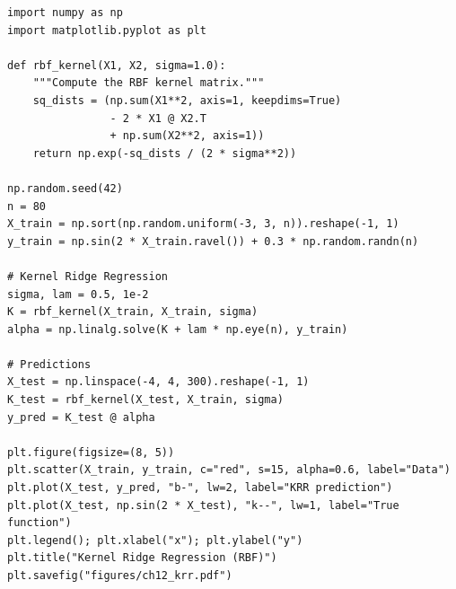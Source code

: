 \begin{codeblock}[title=\textbf{Kernel Ridge Regression from Scratch}]
\begin{verbatim}
import numpy as np
import matplotlib.pyplot as plt

def rbf_kernel(X1, X2, sigma=1.0):
    """Compute the RBF kernel matrix."""
    sq_dists = (np.sum(X1**2, axis=1, keepdims=True)
                - 2 * X1 @ X2.T
                + np.sum(X2**2, axis=1))
    return np.exp(-sq_dists / (2 * sigma**2))

np.random.seed(42)
n = 80
X_train = np.sort(np.random.uniform(-3, 3, n)).reshape(-1, 1)
y_train = np.sin(2 * X_train.ravel()) + 0.3 * np.random.randn(n)

# Kernel Ridge Regression
sigma, lam = 0.5, 1e-2
K = rbf_kernel(X_train, X_train, sigma)
alpha = np.linalg.solve(K + lam * np.eye(n), y_train)

# Predictions
X_test = np.linspace(-4, 4, 300).reshape(-1, 1)
K_test = rbf_kernel(X_test, X_train, sigma)
y_pred = K_test @ alpha

plt.figure(figsize=(8, 5))
plt.scatter(X_train, y_train, c="red", s=15, alpha=0.6, label="Data")
plt.plot(X_test, y_pred, "b-", lw=2, label="KRR prediction")
plt.plot(X_test, np.sin(2 * X_test), "k--", lw=1, label="True function")
plt.legend(); plt.xlabel("x"); plt.ylabel("y")
plt.title("Kernel Ridge Regression (RBF)")
plt.savefig("figures/ch12_krr.pdf")
\end{verbatim}
\end{codeblock}


